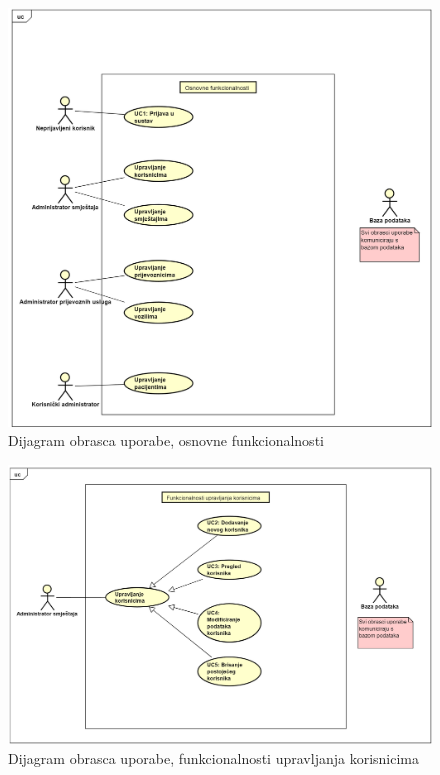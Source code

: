 					\begin{figure}[H]
						\centering
						\includegraphics[width=\textwidth]{slike/DOU_OsnovneFunkcionalnosti.png} %
						\caption{Dijagram obrasca uporabe, osnovne funkcionalnosti}
						\label{fig:osnovne funkcionalnosti}
					\end{figure}
				\eject		
				
					\begin{figure}[H]
					\centering
					\includegraphics[width=\textwidth]{slike/DOU_FunkcionalnostiUpravljanjaKorisnicima.png} %
					\caption{Dijagram obrasca uporabe, funkcionalnosti upravljanja korisnicima}
					\label{fig:funkcionalnosti upravljanja korisnicima}
				\end{figure}
				\eject		
				
